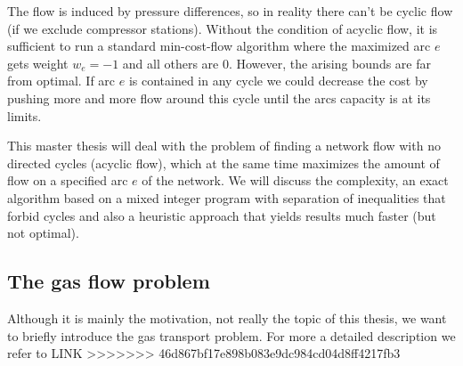 The flow is induced by pressure differences, so in reality there can't be cyclic flow (if we exclude compressor 
stations). Without the condition of acyclic flow, it is sufficient to run a standard min-cost-flow algorithm where the 
maximized arc $e$ gets weight $w_e = -1$ and all others are 0. However, the arising bounds are far from optimal. If arc 
$e$ is contained in any cycle we could decrease the cost by pushing more and more flow around this cycle until the arcs 
capacity is at its limits.

This master thesis will deal with the problem of finding a network flow with no directed cycles (acyclic flow), which at 
the same time maximizes the amount of flow on a specified arc $e$ of the network. We will discuss the complexity, an 
exact algorithm based on a mixed integer program with separation of inequalities that forbid cycles and also a heuristic 
approach that yields results much faster (but not optimal).%

\subsection{The gas flow problem}
Although it is mainly the motivation, not really the topic of this thesis, we want to briefly introduce the gas 
transport problem. For more a detailed description we refer to LINK %
>>>>>>> 46d867bf17e898b083e9dc984cd04d8ff4217fb3
